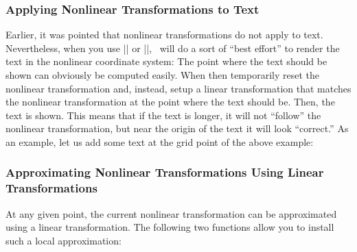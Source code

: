 \subsubsection{Applying Nonlinear Transformations to Text}

Earlier, it was pointed that nonlinear transformations do not apply
to text. Nevertheless, when you use |\pgftext| or |\pgfnode|,
\pgfname\ will do a sort of ``best effort'' to render the text in
the nonlinear coordinate system: The point where the text should be
shown can obviously be computed easily. When then temporarily reset
the nonlinear transformation and, instead, setup a linear
transformation that matches the nonlinear transformation at the
point where the text should be. Then, the text is shown. This means
that if the text is longer, it will not ``follow'' the nonlinear
transformation, but near the origin of the text it will look
``correct.'' As an example, let us add some text at the grid point
of the above example:

\begin{codeexample}[]
\end{codeexample}


\subsubsection{Approximating Nonlinear Transformations Using Linear Transformations}

At any given point, the current nonlinear transformation can be
approximated using a linear transformation. The following two
functions allow you to install such a local approximation:


